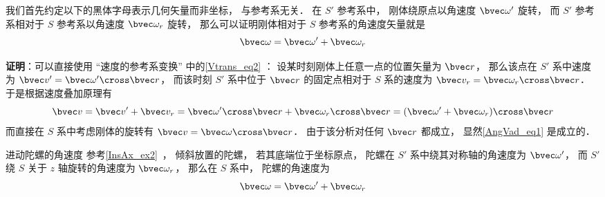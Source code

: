 

我们首先约定以下的黑体字母表示几何矢量而非坐标， 与参考系无关． 在 $S'$ 参考系中， 刚体绕原点以角速度 $\bvec \omega'$ 旋转， 而 $S'$ 参考系相对于 $S$ 参考系以角速度 $\bvec \omega_r$ 旋转， 那么可以证明刚体相对于 $S$ 参考系的角速度矢量就是
\begin{equation}\label{AngVad_eq1}
\bvec \omega = \bvec \omega' + \bvec \omega_r
\end{equation}

\textbf{证明}：可以直接使用 “速度的参考系变换” 中的\autoref{Vtrans_eq2} ： 设某时刻刚体上任意一点的位置矢量为 $\bvec r$， 那么该点在 $S'$ 系中速度为 $\bvec v' = \bvec\omega'\cross\bvec r$， 而该时刻 $S'$ 系中位于 $\bvec r$ 的固定点相对于 $S$ 系的速度为 $\bvec v_r = \bvec\omega_r\cross\bvec r$． 于是根据速度叠加原理有
\begin{equation}
\bvec v = \bvec v' + \bvec v_r = \bvec\omega'\cross\bvec r + \bvec\omega_r\cross\bvec r
= (\bvec\omega' + \bvec\omega_r)\cross\bvec r
\end{equation}
而直接在 $S$ 系中考虑刚体的旋转有 $\bvec v = \bvec\omega\cross\bvec r$． 由于该分析对任何 $\bvec r$ 都成立， 显然\autoref{AngVad_eq1} 是成立的．

\begin{example}{进动陀螺的角速度}\label{AngVad_ex1}
参考\autoref{InsAx_ex2}~， 倾斜放置的陀螺， 若其底端位于坐标原点， 陀螺在 $S'$ 系中绕其对称轴的角速度为 $\bvec \omega'$， 而 $S'$ 绕 $S$ 关于 $z$ 轴旋转的角速度为 $\bvec \omega_r$， 那么在 $S$ 系中， 陀螺的角速度为
\begin{equation}
\bvec \omega = \bvec \omega' + \bvec \omega_r
\end{equation}
\end{example}
